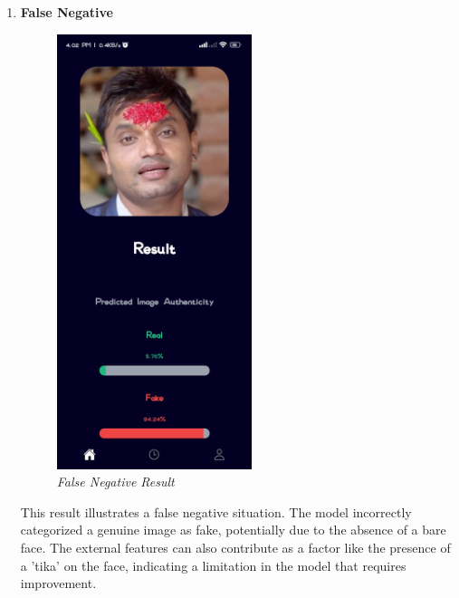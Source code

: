 \begin{enumerate}
    \item \textbf{False Negative}
          \\
          \begin{figure}[ht]
              \centering
              \includegraphics[height =5in ]{img/dashainResult.jpg}
              \caption{\textit{False Negative Result}}
          \end{figure}

          This result illustrates a false negative situation. The model incorrectly categorized a genuine image as fake, potentially due to the absence of a bare face. The external features can also contribute as a factor like the presence of a 'tika' on the face, indicating a limitation in the model that requires improvement.

          \newpage

\end{enumerate}


